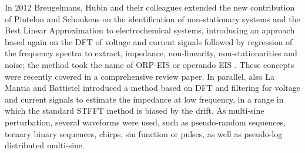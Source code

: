 In 2012 Breugelmans, Hubin and their colleagues extended the new contribution of Pintelon and Schoukens on the identification of non-stationary systems and the Best Linear Approximation to electrochemical systems, introducing an approach based again on the DFT of voltage and current signals followed by regression of the frequency spectra to extract, impedance, non-linearity, non-stationarities and noise; the method took the name of ORP-EIS or operando EIS \cite{breugelmansOddRandomPhase2012}. These concepts were recently covered in a comprehensive review paper\cite{hallemans2023electrochemical}. In parallel, also La Mantia and Battistel \cite{battistel2016analysis} introduced a method based on DFT and filtering for voltage and current signals to estimate the impedance at low frequency, in a range in which the standard STFFT method is biased by the drift. As multi-sine perturbation, several waveforms were used, such as pseudo-random sequences, ternary binary sequences, chirps\cite{darowickiDeterminationElectrodeImpedance2004}, sin function or pulses, as well as pseudo-log distributed multi-sine.